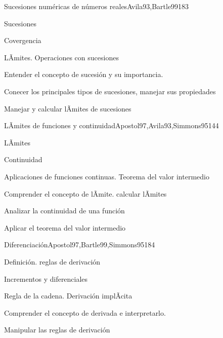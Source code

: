 \begin{syllabus}
\begin{unit}{Sucesiones numéricas de números reales}{Avila93,Bartle99}{18}{3}
   \begin{topics}
      \item Sucesiones
      \item Covergencia
      \item LÃ­mites. Operaciones con sucesiones
   \end{topics}

   \begin{unitgoals}
      \item Entender el concepto de sucesión y su importancia.
      \item Conecer los principales tipos de sucesiones, manejar sus propiedades
      \item Manejar y calcular lÃ­mites de sucesiones
      \end{unitgoals}
\end{unit}

\begin{unit}{LÃ­mites de funciones y continuidad}{Apostol97,Avila93,Simmons95}{14}{4}
   \begin{topics}
      \item LÃ­mites
      \item Continuidad
      \item Aplicaciones de funciones continuas. Teorema del valor intermedio
   \end{topics}

   \begin{unitgoals}
      \item Comprender el concepto de lÃ­mite. calcular lÃ­mites
      \item Analizar la continuidad de una función
      \item Aplicar el teorema del valor intermedio
      \end{unitgoals}
\end{unit}

\begin{unit}{Diferenciación}{Apostol97,Bartle99,Simmons95}{18}{4}
   \begin{topics}
      \item Definición. reglas de derivación
      \item Incrementos y diferenciales
      \item Regla de la cadena. Derivación implÃ­cita
   \end{topics}

   \begin{unitgoals}
      \item Comprender el concepto de derivada e interpretarlo.
      \item Manipular las reglas de derivación
      \end{unitgoals}
\end{unit}


\end{syllabus}
